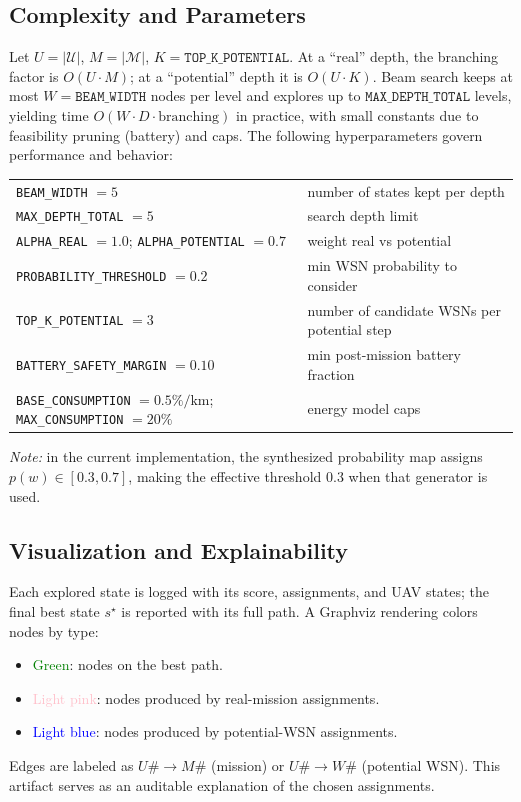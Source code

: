 \subsection*{Complexity and Parameters}
Let \(U=|\mathcal{U}|\), \(M=|\mathcal{M}|\), \(K=\texttt{TOP\_K\_POTENTIAL}\).
At a ``real'' depth, the branching factor is \(O(U\cdot M)\); at a ``potential'' depth it is \(O(U\cdot K)\).
Beam search keeps at most \(W=\texttt{BEAM\_WIDTH}\) nodes per level and explores up to
\(\texttt{MAX\_DEPTH\_TOTAL}\) levels, yielding time \(O\!\left(W \cdot D \cdot \text{branching}\right)\)
in practice, with small constants due to feasibility pruning (battery) and caps.
The following hyperparameters govern performance and behavior:
\begin{center}
\begin{tabular}{ll}
\texttt{BEAM\_WIDTH} $=5$ & number of states kept per depth \\
\texttt{MAX\_DEPTH\_TOTAL} $=5$ & search depth limit \\
\texttt{ALPHA\_REAL} $=1.0$; \texttt{ALPHA\_POTENTIAL} $=0.7$ & weight real vs potential \\
\texttt{PROBABILITY\_THRESHOLD} $=0.2$ & min WSN probability to consider \\
\texttt{TOP\_K\_POTENTIAL} $=3$ & number of candidate WSNs per potential step \\
\texttt{BATTERY\_SAFETY\_MARGIN} $=0.10$ & min post-mission battery fraction \\
\texttt{BASE\_CONSUMPTION} $=0.5\%/\text{km}$; \texttt{MAX\_CONSUMPTION} $=20\%$ & energy model caps \\
\end{tabular}
\end{center}
\emph{Note:} in the current implementation, the synthesized probability map assigns
\(p(w)\in[0.3, 0.7]\), making the effective threshold \(0.3\) when that generator is used.

\subsection*{Visualization and Explainability}
Each explored state is logged with its score, assignments, and UAV states; the final best state
\(s^\star\) is reported with its full path. A Graphviz rendering colors nodes by type:
\begin{itemize}
  \item \textcolor{green}{Green}: nodes on the best path.
  \item \textcolor{pink}{Light pink}: nodes produced by real-mission assignments.
  \item \textcolor{blue}{Light blue}: nodes produced by potential-WSN assignments.
\end{itemize}
Edges are labeled as \(U\# \rightarrow M\#\) (mission) or \(U\# \rightarrow W\#\) (potential WSN).
This artifact serves as an auditable explanation of the chosen assignments.

